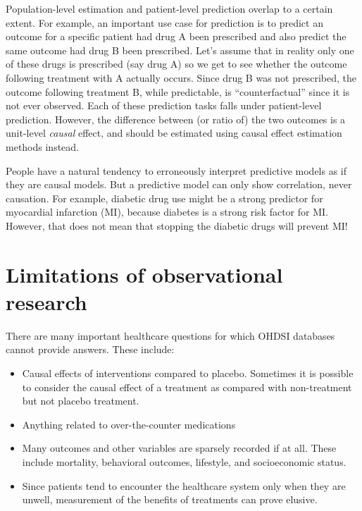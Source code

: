 \documentclass[11pt]{book}
\providecommand{\tightlist}{%
  \setlength{\itemsep}{0pt}\setlength{\parskip}{0pt}}
\let\BeginKnitrBlock\begin \let\EndKnitrBlock\end
\begin{document}
Population-level estimation and patient-level prediction overlap to a
certain extent. For example, an important use case for prediction is to
predict an outcome for a specific patient had drug A been prescribed and
also predict the same outcome had drug B been prescribed. Let's assume
that in reality only one of these drugs is prescribed (say drug A) so we
get to see whether the outcome following treatment with A actually
occurs. Since drug B was not prescribed, the outcome following treatment
B, while predictable, is ``counterfactual'' since it is not ever
observed. Each of these prediction tasks falls under patient-level
prediction. However, the difference between (or ratio of) the two
outcomes is a unit-level \emph{causal} effect, and should be estimated
using causal effect estimation methods instead.

\BeginKnitrBlock{rmdimportant}
People have a natural tendency to erroneously interpret predictive
models as if they are causal models. But a predictive model can only
show correlation, never causation. For example, diabetic drug use might
be a strong predictor for myocardial infarction (MI), because diabetes
is a strong risk factor for MI. However, that does not mean that
stopping the diabetic drugs will prevent MI!
\EndKnitrBlock{rmdimportant}

\section{Limitations of observational
research}\label{limitations-of-observational-research}

There are many important healthcare questions for which OHDSI databases
cannot provide answers. These include:

\begin{itemize}
\tightlist
\item
  Causal effects of interventions compared to placebo. Sometimes it is
  possible to consider the causal effect of a treatment as compared with
  non-treatment but not placebo treatment.
\item
  Anything related to over-the-counter medications
\item
  Many outcomes and other variables are sparsely recorded if at all.
  These include mortality, behavioral outcomes, lifestyle, and
  socioeconomic status.
\item
  Since patients tend to encounter the healthcare system only when they
  are unwell, measurement of the benefits of treatments can prove
  elusive.
\end{itemize}
\end{document}
